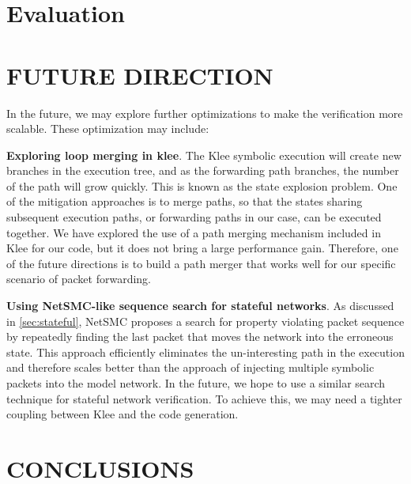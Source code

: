 \documentclass[letterpaper, 10 pt, conference]{ieeeconf}  %
\begin{document}
\section{Evaluation}\label{sec:eval}

\section{FUTURE DIRECTION}\label{sec:fd}

In the future, we may explore further optimizations to make the verification more scalable. These optimization may include:

\textbf{Exploring loop merging in klee}. 
The Klee symbolic execution will create new branches in the execution tree, and as the forwarding path branches, the number of the path will grow quickly. 
This is known as the state explosion problem. 
One of the mitigation approaches is to merge paths, so that the states sharing subsequent execution paths, or forwarding paths in our case, can be executed together. 
We have explored the use of a path merging mechanism included in Klee for our code, but it does not bring a large performance gain. 
Therefore, one of the future directions is to build a path merger that works well for our specific scenario of packet forwarding. 

\textbf{Using NetSMC-like sequence search for stateful networks}.
As discussed in \ref{sec:stateful}, NetSMC\cite{NetSMC} proposes a search for property violating packet sequence by repeatedly finding the last packet that moves the network into the erroneous state. 
This approach efficiently eliminates the un-interesting path in the execution and therefore scales better than the approach of injecting multiple symbolic packets into the model network. 
In the future, we hope to use a similar search technique for stateful network verification. 
To achieve this, we may need a tighter coupling between Klee and the code generation. 

\section{CONCLUSIONS}\label{sec:c}




\addtolength{\textheight}{-12cm}  


\end{document}
